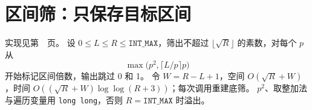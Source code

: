 \section{区间筛：只保存目标区间}\label{knowledge-segmented-sieve}
实现见第~\pageref{compact-segmented_primes}~页。
设 $0\le L\le R\le\texttt{INT\_MAX}$，筛出不超过 $\lfloor\sqrt R\rfloor$ 的素数，对每个 $p$ 从
\[
\max\bigl(p^2,\lceil L/p\rceil p\bigr)
\]
开始标记区间倍数，输出跳过 0 和 1。
令 $W=R-L+1$，空间 $O(\sqrt R+W)$，时间 $O((\sqrt R+W)\log\log(R+3))$；每次调用重建底筛。
$p^2$、取整加法与遍历变量用 \texttt{long long}，否则 $R=\texttt{INT\_MAX}$ 时溢出。
